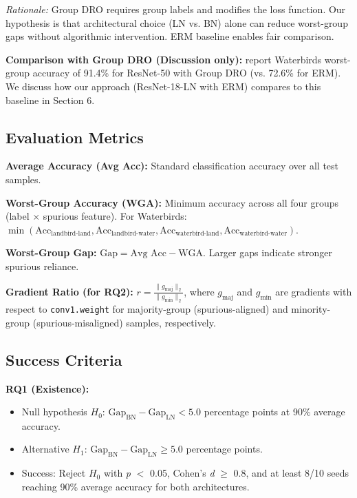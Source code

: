 \emph{Rationale:} Group DRO \cite{sagawa2020distributionally} requires group labels and modifies the loss function. Our hypothesis is that architectural choice (LN vs. BN) alone can reduce worst-group gaps without algorithmic intervention. ERM baseline enables fair comparison.

\textbf{Comparison with Group DRO (Discussion only):}
\cite{sagawa2020distributionally} report Waterbirds worst-group accuracy of 91.4\% for ResNet-50 with Group DRO (vs. 72.6\% for ERM). We discuss how our approach (ResNet-18-LN with ERM) compares to this baseline in Section 6.

\subsection{Evaluation Metrics}

\textbf{Average Accuracy (Avg Acc):}
Standard classification accuracy over all test samples.

\textbf{Worst-Group Accuracy (WGA):}
Minimum accuracy across all four groups (label $\times$ spurious feature). For Waterbirds: $\min(\text{Acc}_{\text{landbird-land}}, \text{Acc}_{\text{landbird-water}}, \text{Acc}_{\text{waterbird-land}}, \text{Acc}_{\text{waterbird-water}})$.

\textbf{Worst-Group Gap:}
$\text{Gap} = \text{Avg Acc} - \text{WGA}$. Larger gaps indicate stronger spurious reliance.

\textbf{Gradient Ratio (for RQ2):}
$r = \frac{\|g_{\text{maj}}\|_2}{\|g_{\text{min}}\|_2}$, where $g_{\text{maj}}$ and $g_{\text{min}}$ are gradients with respect to \texttt{conv1.weight} for majority-group (spurious-aligned) and minority-group (spurious-misaligned) samples, respectively.

\subsection{Success Criteria}

\textbf{RQ1 (Existence):}
\begin{itemize}
\item Null hypothesis $H_0$: $\text{Gap}_{\text{BN}} - \text{Gap}_{\text{LN}} < 5.0$ percentage points at 90\% average accuracy.
\item Alternative $H_1$: $\text{Gap}_{\text{BN}} - \text{Gap}_{\text{LN}} \geq 5.0$ percentage points.
\item Success: Reject $H_0$ with \emph{p} $<$ 0.05, Cohen's \emph{d} $\geq$ 0.8, and at least 8/10 seeds reaching 90\% average accuracy for both architectures.
\end{itemize}

